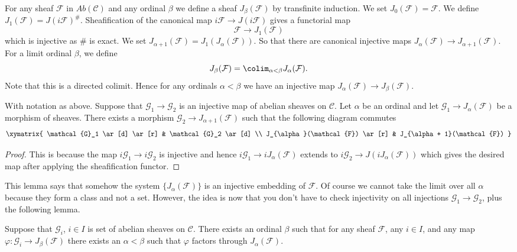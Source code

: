 \medskip\noindent
For any sheaf $\mathcal{F}$ in $\textit{Ab}(\mathcal{C})$ and
any ordinal $\beta$ we define a sheaf
$J_\beta(\mathcal{F})$ by transfinite induction.
We set $J_0(\mathcal{F}) = \mathcal{F}$.
We define $J_1(\mathcal{F}) = J(i\mathcal{F})^\#$.
Sheafification of the canonical map $i\mathcal{F} \to J(i\mathcal{F})$
gives a functorial map
$$
\mathcal{F} \longrightarrow J_1(\mathcal{F})
$$
which is injective as $\#$ is exact. We set
$J_{\alpha + 1}(\mathcal{F}) = J_1(J_\alpha(\mathcal{F}))$.
So that there are canonical injective maps
$J_\alpha(\mathcal{F}) \to J_{\alpha + 1}(\mathcal{F})$.
For a limit ordinal $\beta$, we define
$$
J_\beta(\mathcal{F}) = \colim_{\alpha < \beta} J_\alpha(\mathcal{F}).
$$
Note that this is a directed colimit. Hence for any ordinals $\alpha < \beta$
we have an injective map $J_\alpha(\mathcal{F}) \to J_\beta(\mathcal{F})$.

\begin{lemma}
\label{lemma-map-into-next-one}
With notation as above.
Suppose that $\mathcal{G}_1 \to \mathcal{G}_2$ is an injective
map of abelian sheaves on $\mathcal{C}$. Let $\alpha$ be an ordinal
and let $\mathcal{G}_1 \to J_\alpha(\mathcal{F})$ be a morphism
of sheaves. There exists a morphism $\mathcal{G}_2 \to
J_{\alpha + 1}(\mathcal{F})$ such that the following diagram commutes
$$
\xymatrix{
\mathcal{G}_1 \ar[d] \ar[r] & \mathcal{G}_2 \ar[d] \\
J_{\alpha}(\mathcal{F}) \ar[r] & J_{\alpha + 1}(\mathcal{F}) }
$$
\end{lemma}

\begin{proof}
This is because the map $i\mathcal{G}_1 \to i\mathcal{G}_2$ is injective
and hence $i\mathcal{G}_1 \to iJ_\alpha(\mathcal{F})$ extends to
$i\mathcal{G}_2 \to J(iJ_\alpha(\mathcal{F}))$ which gives the
desired map after applying the sheafification functor.
\end{proof}

\noindent
This lemma says that somehow the system $\{J_{\alpha}(\mathcal{F})\}$
is an injective embedding of $\mathcal{F}$. Of course
we cannot take the limit over all $\alpha$ because they form a class
and not a set. However, the idea is now that you don't have to check
injectivity on all injections $\mathcal{G}_1 \to \mathcal{G}_2$, plus
the following lemma.

\begin{lemma}
\label{lemma-map-into-smaller}
Suppose that $\mathcal{G}_i$, $i\in I$ is set of abelian sheaves
on $\mathcal{C}$. There exists an ordinal $\beta$ such that
for any sheaf $\mathcal{F}$, any $i\in I$, and any map
$\varphi : \mathcal{G}_i \to J_\beta(\mathcal{F})$ there exists an
$\alpha < \beta$ such that $ \varphi $ factors through
$J_\alpha(\mathcal{F})$.
\end{lemma}

